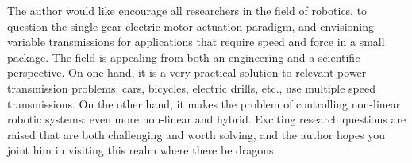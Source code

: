 The author would like encourage all researchers in the field of robotics, to question the single-gear-electric-motor actuation paradigm, and envisioning variable transmissions for applications that require speed and force in a small package. The field is appealing from both an engineering and a scientific perspective. On one hand, it is a very practical solution to relevant power transmission problems: cars, bicycles, electric drills, etc., use multiple speed transmissions. On the other hand, it makes the problem of controlling non-linear robotic systems: even more non-linear and hybrid. Exciting research questions are raised that are both challenging and worth solving, and the author hopes you joint him in visiting this realm where there be dragons.






